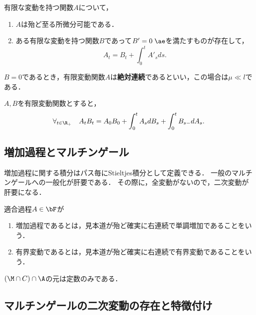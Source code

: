 \documentclass[uplatex,dvipdfmx]{jsreport}
\begin{document}
\begin{theorem}[絶対連続関数の特徴付け]
    有限な変動を持つ関数$A$について，
    \begin{enumerate}
        \item $A$は殆ど至る所微分可能である．
        \item ある有限な変動を持つ関数$B$であって$B'=0\;\ae$を満たすものが存在して，
        \[A_t=B_t+\int^t_0A'_sds.\]
    \end{enumerate}
    $B=0$であるとき，有限変動関数$A$は\textbf{絶対連続}であるといい，この場合は$\mu\ll l$である．
\end{theorem}

\begin{proposition}
    $A,B$を有限変動関数とすると，
    \[\forall_{t\in\R_+}\quad A_tB_t=A_0B_0+\int^t_0A_sdB_s+\int^t_0B_{s-}dA_s.\]
\end{proposition}

\subsection{増加過程とマルチンゲール}

\begin{tcolorbox}[colframe=ForestGreen, colback=ForestGreen!10!white,breakable,colbacktitle=ForestGreen!40!white,coltitle=black,fonttitle=\bfseries\sffamily,
title=]
    増加過程に関する積分はパス毎にStieltjes積分として定義できる．
    一般のマルチンゲールへの一般化が肝要である．
    その際に，全変動がないので，二次変動が肝要になる．
\end{tcolorbox}

\begin{definition}
    適合過程$A\in\bF$が
    \begin{enumerate}
        \item 増加過程であるとは，見本道が殆ど確実に右連続で単調増加であることをいう．
        \item 有界変動であるとは，見本道が殆ど確実に右連続で有界変動であることをいう．
    \end{enumerate}
\end{definition}

\begin{proposition}
    $(\M\cap C)\cap\A$の元は定数のみである．
\end{proposition}

\subsection{マルチンゲールの二次変動の存在と特徴付け}
\end{document}
